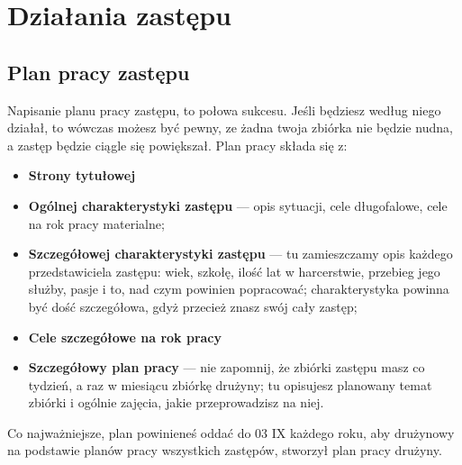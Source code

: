 \chapter{Działania zastępu}
\section{Plan pracy zastępu}
Napisanie planu pracy zastępu, to połowa sukcesu. Jeśli będziesz według niego działał, to wówczas możesz być pewny, ze żadna twoja zbiórka nie będzie nudna, a zastęp będzie ciągle się powiększał. Plan pracy składa się z:
\begin{itemize}[noitemsep] 
\item \textbf{Strony tytułowej}
\item \textbf{Ogólnej charakterystyki zastępu} --- opis sytuacji, cele długofalowe, cele na rok pracy materialne;
\item \textbf{Szczegółowej charakterystyki zastępu} --- tu zamieszczamy opis każdego przedstawiciela zastępu: wiek, szkołę, ilość lat w harcerstwie, przebieg jego służby, pasje i to, nad czym powinien popracować; charakterystyka powinna być dość szczegółowa, gdyż przecież znasz swój cały zastęp;
\item \textbf{Cele szczegółowe na rok pracy}
\item \textbf{Szczegółowy plan pracy} --- nie zapomnij, że zbiórki zastępu masz co tydzień, a raz w miesiącu zbiórkę drużyny; tu opisujesz planowany temat zbiórki i ogólnie zajęcia, jakie przeprowadzisz na niej.
\end{itemize}

\noindent
Co najważniejsze, plan powinieneś oddać do 03 IX każdego roku, aby drużynowy na podstawie planów pracy wszystkich zastępów, stworzył plan pracy drużyny. 

